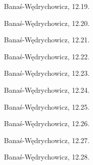\begin{integral}
Banaś-Wędrychowicz, 12.19.
\end{integral}

\begin{integral}
Banaś-Wędrychowicz, 12.20.
\end{integral}

\begin{integral}
Banaś-Wędrychowicz, 12.21.
\end{integral}

\begin{integral}
Banaś-Wędrychowicz, 12.22.
\end{integral}

\begin{integral}
Banaś-Wędrychowicz, 12.23.
\end{integral}

\begin{integral}
Banaś-Wędrychowicz, 12.24.
\end{integral}

\begin{integral}
Banaś-Wędrychowicz, 12.25.
\end{integral}

\begin{integral}
Banaś-Wędrychowicz, 12.26.
\end{integral}

\begin{integral}
Banaś-Wędrychowicz, 12.27.
\end{integral}

\begin{integral}
Banaś-Wędrychowicz, 12.28.
\end{integral}

%